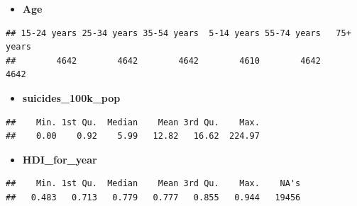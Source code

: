 \documentclass[]{article}
\newenvironment{Shaded}{\begin{snugshade}}{\end{snugshade}}
\newcommand{\CommentTok}[1]{\textcolor[rgb]{0.56,0.35,0.01}{\textit{#1}}}
\newcommand{\FloatTok}[1]{\textcolor[rgb]{0.00,0.00,0.81}{#1}}
\newcommand{\KeywordTok}[1]{\textcolor[rgb]{0.13,0.29,0.53}{\textbf{#1}}}
\newcommand{\NormalTok}[1]{#1}
\newcommand{\OperatorTok}[1]{\textcolor[rgb]{0.81,0.36,0.00}{\textbf{#1}}}
\providecommand{\tightlist}{%
  \setlength{\itemsep}{0pt}\setlength{\parskip}{0pt}}
\begin{document}
\begin{itemize}
\tightlist
\item
  \textbf{Age}
\end{itemize}

\begin{Shaded}
\end{Shaded}

\begin{verbatim}
## 15-24 years 25-34 years 35-54 years  5-14 years 55-74 years   75+ years 
##        4642        4642        4642        4610        4642        4642
\end{verbatim}

\begin{itemize}
\tightlist
\item
  \textbf{suicides\_100k\_pop}
\end{itemize}

\begin{Shaded}
\end{Shaded}

\begin{verbatim}
##    Min. 1st Qu.  Median    Mean 3rd Qu.    Max. 
##    0.00    0.92    5.99   12.82   16.62  224.97
\end{verbatim}

\begin{itemize}
\tightlist
\item
  \textbf{HDI\_for\_year}
\end{itemize}

\begin{Shaded}
\end{Shaded}

\begin{verbatim}
##    Min. 1st Qu.  Median    Mean 3rd Qu.    Max.    NA's 
##   0.483   0.713   0.779   0.777   0.855   0.944   19456
\end{verbatim}
\end{document}
